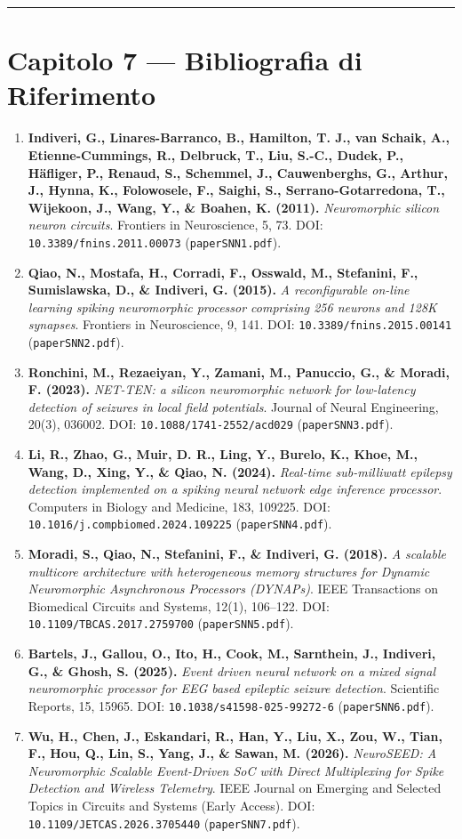 \documentclass[11pt,a4paper]{article}
\begin{document}
\bigskip\hrule\bigskip

\section{Capitolo 7 --- Bibliografia di Riferimento}

\begin{enumerate}
  \item \textbf{Indiveri, G., Linares-Barranco, B., Hamilton, T. J., van Schaik, A., Etienne-Cummings, R., Delbruck, T., Liu, S.-C., Dudek, P., Häfliger, P., Renaud, S., Schemmel, J., Cauwenberghs, G., Arthur, J., Hynna, K., Folowosele, F., Saighi, S., Serrano-Gotarredona, T., Wijekoon, J., Wang, Y., \& Boahen, K. (2011).} \textit{Neuromorphic silicon neuron circuits}. Frontiers in Neuroscience, 5, 73. DOI: \texttt{10.3389/fnins.2011.00073} (\texttt{paperSNN1.pdf}).
  \item \textbf{Qiao, N., Mostafa, H., Corradi, F., Osswald, M., Stefanini, F., Sumislawska, D., \& Indiveri, G. (2015).} \textit{A reconfigurable on-line learning spiking neuromorphic processor comprising 256 neurons and 128K synapses}. Frontiers in Neuroscience, 9, 141. DOI: \texttt{10.3389/fnins.2015.00141} (\texttt{paperSNN2.pdf}).
  \item \textbf{Ronchini, M., Rezaeiyan, Y., Zamani, M., Panuccio, G., \& Moradi, F. (2023).} \textit{NET-TEN: a silicon neuromorphic network for low-latency detection of seizures in local field potentials}. Journal of Neural Engineering, 20(3), 036002. DOI: \texttt{10.1088/1741-2552/acd029} (\texttt{paperSNN3.pdf}).
  \item \textbf{Li, R., Zhao, G., Muir, D. R., Ling, Y., Burelo, K., Khoe, M., Wang, D., Xing, Y., \& Qiao, N. (2024).} \textit{Real-time sub-milliwatt epilepsy detection implemented on a spiking neural network edge inference processor}. Computers in Biology and Medicine, 183, 109225. DOI: \texttt{10.1016/j.compbiomed.2024.109225} (\texttt{paperSNN4.pdf}).
  \item \textbf{Moradi, S., Qiao, N., Stefanini, F., \& Indiveri, G. (2018).} \textit{A scalable multicore architecture with heterogeneous memory structures for Dynamic Neuromorphic Asynchronous Processors (DYNAPs)}. IEEE Transactions on Biomedical Circuits and Systems, 12(1), 106--122. DOI: \texttt{10.1109/TBCAS.2017.2759700} (\texttt{paperSNN5.pdf}).
  \item \textbf{Bartels, J., Gallou, O., Ito, H., Cook, M., Sarnthein, J., Indiveri, G., \& Ghosh, S. (2025).} \textit{Event driven neural network on a mixed signal neuromorphic processor for EEG based epileptic seizure detection}. Scientific Reports, 15, 15965. DOI: \texttt{10.1038/s41598-025-99272-6} (\texttt{paperSNN6.pdf}).
  \item \textbf{Wu, H., Chen, J., Eskandari, R., Han, Y., Liu, X., Zou, W., Tian, F., Hou, Q., Lin, S., Yang, J., \& Sawan, M. (2026).} \textit{NeuroSEED: A Neuromorphic Scalable Event-Driven SoC with Direct Multiplexing for Spike Detection and Wireless Telemetry}. IEEE Journal on Emerging and Selected Topics in Circuits and Systems (Early Access). DOI: \texttt{10.1109/JETCAS.2026.3705440} (\texttt{paperSNN7.pdf}).
\end{enumerate}
\end{document}

